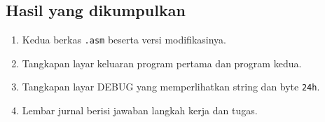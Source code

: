\subsection{Hasil yang dikumpulkan}

\begin{enumerate}
    \item Kedua berkas \texttt{.asm} beserta versi modifikasinya.
    \item Tangkapan layar keluaran program pertama dan program kedua.
    \item Tangkapan layar DEBUG yang memperlihatkan string dan byte
          \texttt{24h}.
    \item Lembar jurnal berisi jawaban langkah kerja dan tugas.
\end{enumerate}
